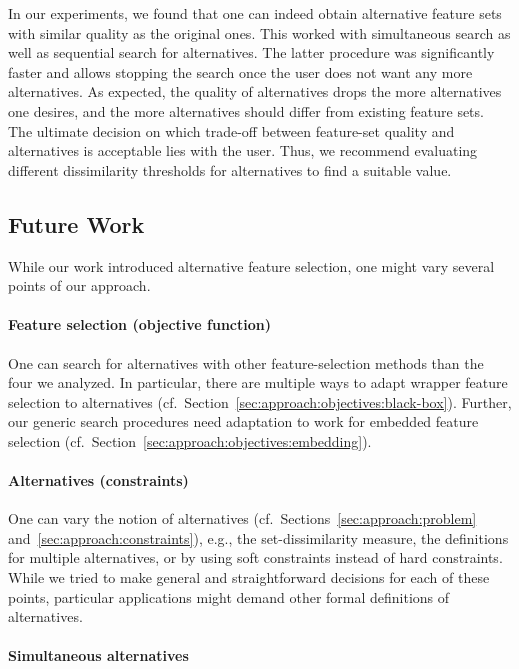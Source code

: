 \documentclass{article}
\theoremstyle{definition}
\begin{document}
In our experiments, we found that one can indeed obtain alternative feature sets with similar quality as the original ones.
This worked with simultaneous search as well as sequential search for alternatives.
The latter procedure was significantly faster and allows stopping the search once the user does not want any more alternatives.
As expected, the quality of alternatives drops the more alternatives one desires, and the more alternatives should differ from existing feature sets.
The ultimate decision on which trade-off between feature-set quality and alternatives is acceptable lies with the user.
Thus, we recommend evaluating different dissimilarity thresholds for alternatives to find a suitable value.

\subsection{Future Work}

While our work introduced alternative feature selection, one might vary several points of our approach.

\paragraph{Feature selection (objective function)}

One can search for alternatives with other feature-selection methods than the four we analyzed.
In particular, there are multiple ways to adapt wrapper feature selection to alternatives (cf.~Section~\ref{sec:approach:objectives:black-box}).
Further, our generic search procedures need adaptation to work for embedded feature selection (cf.~Section~\ref{sec:approach:objectives:embedding}).

\paragraph{Alternatives (constraints)}

One can vary the notion of alternatives (cf.~Sections~\ref{sec:approach:problem} and~\ref{sec:approach:constraints}), e.g., the set-dissimilarity measure, the definitions for multiple alternatives, or by using soft constraints instead of hard constraints.
While we tried to make general and straightforward decisions for each of these points, particular applications might demand other formal definitions of alternatives.

\paragraph{Simultaneous alternatives}
\end{document}
